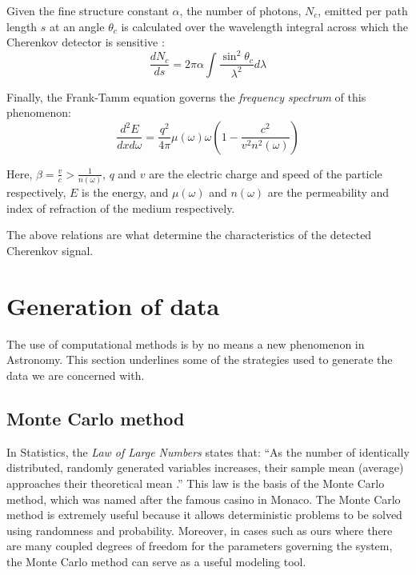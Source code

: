 \documentclass[a4paper, 12pt]{report}
\theoremstyle{definition}
\begin{document}
Given the fine structure constant $\alpha$, the number of photons, $N_c$, emitted per path length $s$ at an angle $\theta_c$ is calculated over the wavelength integral across which the Cherenkov detector is sensitive \autocite{corsika_phys}:
\begin{equation}
    \frac{dN_c}{ds} = 2\pi \alpha \int \frac{\sin^2\theta_c}{\lambda^2} d\lambda
\end{equation}

Finally, the Frank-Tamm equation governs the \textit{frequency spectrum} of this phenomenon:
\begin{equation}
    \frac{d^2E}{dx d\omega}=\frac{q^2}{4\pi}\mu(\omega)\omega \left(1-\frac{c^2}{v^2n^2(\omega)}\right)
\end{equation}

Here, $\beta = \frac{v}{c} > \frac{1}{n(\omega)}$, $q$ and $v$ are the electric charge and speed of the particle respectively, $E$ is the energy, and $\mu(\omega)$ and $n(\omega)$ are the permeability and index of refraction of the medium respectively.

The above relations are what determine the characteristics of the detected Cherenkov signal.

\section{Generation of data}

The use of computational methods is by no means a new phenomenon in Astronomy. This section underlines some of the strategies used to generate the data we are concerned with.

\subsection{Monte Carlo method}

In Statistics, the \textit{Law of Large Numbers} states that: \enquote{As the number of identically distributed, randomly generated variables increases, their sample mean (average) approaches their theoretical mean \autocite{largenumbers}.} This law is the basis of the Monte Carlo method, which was named after the famous casino in Monaco. The Monte Carlo method is extremely useful because it allows deterministic problems to be solved using randomness and probability. Moreover, in cases such as ours where there are many coupled degrees of freedom for the parameters governing the system, the Monte Carlo method can serve as a useful modeling tool.
\end{document}
